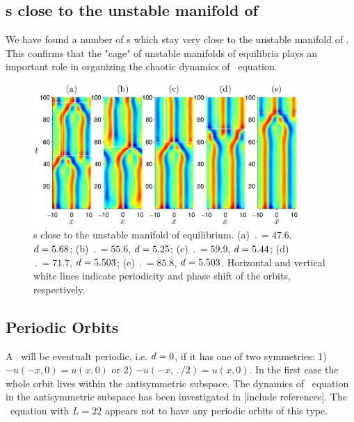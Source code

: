 \subsection{\Rpo s close to the unstable manifold of  }
We have found a number of \rpo s which stay very close to the
unstable manifold of .  This confirms that the "cage" of
unstable manifolds of equilibria plays an important role in
organizing the chaotic dynamics of \KS\ equation.

\begin{figure}[t]
\begin{center}
\includegraphics[width=0.9\textwidth]{figs/ks22rposCage.eps}
\end{center}
\caption{\Rpo s close to the unstable manifold of 
equilibrium. (a) $\period{} = 47.6$, $d = 5.68$; (b) $\period{} = 55.6$,
$d = 5.25$; (c) $\period{} = 59.9$, $d = 5.44$; (d) $\period{} = 71.7$,
$d = 5.503$; (e) $\period{} = 85.8$, $d = 5.503$. Horizontal and
vertical white lines indicate periodicity and phase shift of the
orbits, respectively. }\label{f:ks22rposCage}
\end{figure}

\subsection{Periodic Orbits} \label{ssec:po}
A \rpo\ will be eventualt periodic, i.e. $d = 0$, if it has one of
two symmetries: 1) $-u(-x,0) = u(x,0)$ or 2) $-u(-x,\period{}/2) =
u(x,0)$. In the
first case the whole orbit lives within the antisymmetric subspace.
The dynamics of \KS\ equation in the antisymmetric subspace has been
investigated in [include references]. The \KS\ equation with $L =
22$ appears not to have any periodic orbits of this type.

